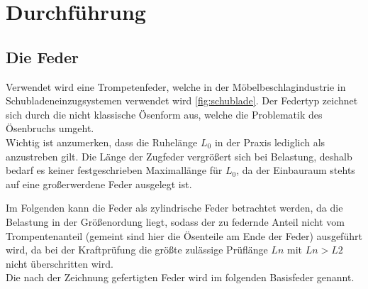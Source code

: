 \newpage
\section{Durchführung}
\label{sec:Durchfuehrung}

\subsection{Die Feder}
\label{sec:feder}
Verwendet wird eine Trompetenfeder, welche in der Möbelbeschlagindustrie in Schubladeneinzugsystemen
verwendet wird \ref{fig:schublade}. 
Der Federtyp zeichnet sich durch die nicht klassische Ösenform aus, welche die Problematik des Ösenbruchs umgeht.\\

Wichtig ist anzumerken, dass die Ruhelänge $L_0$ in der Praxis lediglich als anzustreben gilt.
Die Länge der Zugfeder vergrößert sich bei Belastung, deshalb bedarf es keiner festgeschrieben Maximallänge für $L_0$, da
der Einbauraum stehts auf eine großerwerdene Feder ausgelegt ist.  

\begin{center}
\end{center}
Im Folgenden kann die Feder als zylindrische Feder betrachtet werden,
da die Belastung in der Größenordung liegt, sodass der zu federnde Anteil nicht 
vom Trompentenanteil (gemeint sind hier die Ösenteile am Ende der Feder)
ausgeführt wird, da bei der Kraftprüfung die größte zulässige Prüflänge $Ln$ mit 
$Ln>L2$ nicht überschritten wird.\\
Die nach der Zeichnung gefertigten Feder wird im folgenden Basisfeder genannt.
\label{subsec:feder}
